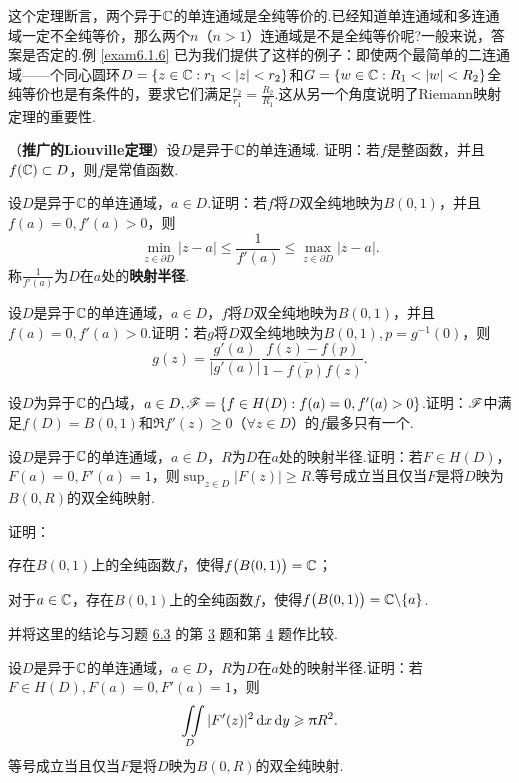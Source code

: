 这个定理断言，两个异于$\mathbb C$的单连通域是全纯等价的.已经知道单连通域和多连通域一定不全纯等价，那么两个$n$（$n>1$）连通域是不是全纯等价呢?一般来说，答案是否定的.例 \ref{exam6.1.6} 已为我们提供了这样的例子：即使两个最简单的二连通域——个同心圆环$D=\{z\in\MC:r_1<|z|<r_2\}$和$G=\{w\in\MC:R_1<|w| <R_2\}$全纯等价也是有条件的，要求它们满足$\frac{r_2}{r_1}=\frac{R_2}{R_1}$.这从另一个角度说明了Riemann映射定理的重要性.

\begin{xiti}\hypertarget{xiti7.2}{}
\item （\textbf{推广的Liouville定理}）设$D$是异于$\mathbb C$的单连通域. 证明：若$f$是整函数，并且$f(\mathbb C)\subset D$，则$f$是常值函数.
\item 设$D$是异于$\mathbb C$的单连通域，$a\in D$.证明：若$f$将$D$双全纯地映为$B(0,1)$，并且$f(a)=0,f'(a)>0$，则
    \[\min_{z\in\partial D}|z-a|\le\frac1{f'(a)}\le\max_{z\in\partial D}|z-a|.\]
称$\frac1{f'(a)}$为$D$在$a$处的\textbf{映射半径}.
\item 设$D$是异于$\mathbb C$的单连通域，$a\in D$，$f$将$D$双全纯地映为$B(0,1)$，并且$f(a)=0,f'(a)>0$.证明：若$g$将$D$双全纯地映为$B(0,1),p=g^{-1}(0)$，则
    \[g(z)=\frac{g'(a)}{|g'(a)|}\frac{f(z)-f(p)}{1-\bar{f(p)}f(z)}.\]
\item 设$D$为异于$\mathbb C$的凸域，$a\in D,\mathscr F=\{f\in H(D):f(a)=0,f'(a)>0\}$.证明：$\mathscr F$中满足$f(D)=B(0,1)$和$\Re f'(z)\ge0$（$\forall z\in D$）的$f$最多只有一个.
\item 设$D$是异于$\mathbb C$的单连通域，$a\in D$，$R$为$D$在$a$处的映射半径.证明：若$F\in H(D) $，$F(a)=0,F'(a)=1$，则$\sup_{z\in D}|F(z)|\ge R$.等号成立当且仅当$F$是将$D$映为$B(0,R)$的双全纯映射.
\item 证明：
\begin{enuma}
  \item 存在$B(0,1)$上的全纯函数$f$，使得$f\big(B(0,1)\big)=\mathbb C$；
  \item 对于$a\in \mathbb C$，存在$B(0,1)$上的全纯函数$f$，使得$f\big(B(0,1)\big)=\mathbb C\backslash\{a\}$.
\end{enuma}
      并将这里的结论与习题 \hyperlink{xiti6.3}{6.3} 的第 \hyperlink{xiti6.3.3}{3} 题和第 \hyperlink{xiti6.3.3}{4} 题作比较.
\item 设$D$是异于$\mathbb C$的单连通域，$a\in D$，$R$为$D$在$a$处的映射半径.证明：若$F\in H(D),F(a)=0,F'(a)=1$，则
    \[\iint\limits_D|F'(z)|^2\mathop{}\!\mathrm dx\mathop{}\!\mathrm dy\geqslant\uppi R^2.\]
等号成立当且仅当$F$是将$D$映为$B(0,R)$的双全纯映射.
\end{xiti}


